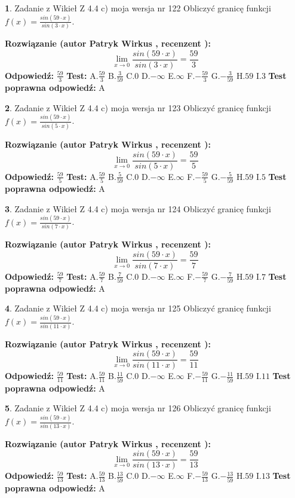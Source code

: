 \documentclass[12pt, a4paper]{article}
\theoremstyle{definition} %
\newtheorem{zad}{}
\newcommand{\zadStart}[1]{\begin{zad}#1\newline}
\newcommand{\zadStop}{\end{zad}}
\newcommand{\rozwStart}[2]{\noindent \textbf{Rozwiązanie (autor #1 , recenzent #2): }\newline}
\newcommand{\rozwStop}{\newline}
\newcommand{\odpStart}{\noindent \textbf{Odpowiedź:}\newline}
\newcommand{\odpStop}{\newline}
\newcommand{\testStart}{\noindent \textbf{Test:}\newline}
\newcommand{\testStop}{\newline}
\newcommand{\kluczStart}{\noindent \textbf{Test poprawna odpowiedź:}\newline}
\newcommand{\kluczStop}{\newline}
\begin{document}
\zadStart{Zadanie z Wikieł Z 4.4 c) moja wersja nr 122}
Obliczyć granicę funkcji $f(x)=\frac{sin(59\cdot x)}{sin(3\cdot x)}$.
\zadStop
\rozwStart{Patryk Wirkus}{}
$$\lim\limits_{x\to 0}\frac{sin(59\cdot x)}{sin(3\cdot x)}=
\frac{59}{3}$$
\rozwStop
\odpStart
$\frac{59}{3}$
\odpStop
\testStart
A.$\frac{59}{3}$
B.$\frac{3}{59}$
C.$0$
D.$-\infty$
E.$\infty$
F.$-\frac{59}{3}$
G.$-\frac{3}{59}$
H.$59$
I.$3$
\testStop
\kluczStart
A
\kluczStop



\zadStart{Zadanie z Wikieł Z 4.4 c) moja wersja nr 123}
Obliczyć granicę funkcji $f(x)=\frac{sin(59\cdot x)}{sin(5\cdot x)}$.
\zadStop
\rozwStart{Patryk Wirkus}{}
$$\lim\limits_{x\to 0}\frac{sin(59\cdot x)}{sin(5\cdot x)}=
\frac{59}{5}$$
\rozwStop
\odpStart
$\frac{59}{5}$
\odpStop
\testStart
A.$\frac{59}{5}$
B.$\frac{5}{59}$
C.$0$
D.$-\infty$
E.$\infty$
F.$-\frac{59}{5}$
G.$-\frac{5}{59}$
H.$59$
I.$5$
\testStop
\kluczStart
A
\kluczStop



\zadStart{Zadanie z Wikieł Z 4.4 c) moja wersja nr 124}
Obliczyć granicę funkcji $f(x)=\frac{sin(59\cdot x)}{sin(7\cdot x)}$.
\zadStop
\rozwStart{Patryk Wirkus}{}
$$\lim\limits_{x\to 0}\frac{sin(59\cdot x)}{sin(7\cdot x)}=
\frac{59}{7}$$
\rozwStop
\odpStart
$\frac{59}{7}$
\odpStop
\testStart
A.$\frac{59}{7}$
B.$\frac{7}{59}$
C.$0$
D.$-\infty$
E.$\infty$
F.$-\frac{59}{7}$
G.$-\frac{7}{59}$
H.$59$
I.$7$
\testStop
\kluczStart
A
\kluczStop



\zadStart{Zadanie z Wikieł Z 4.4 c) moja wersja nr 125}
Obliczyć granicę funkcji $f(x)=\frac{sin(59\cdot x)}{sin(11\cdot x)}$.
\zadStop
\rozwStart{Patryk Wirkus}{}
$$\lim\limits_{x\to 0}\frac{sin(59\cdot x)}{sin(11\cdot x)}=
\frac{59}{11}$$
\rozwStop
\odpStart
$\frac{59}{11}$
\odpStop
\testStart
A.$\frac{59}{11}$
B.$\frac{11}{59}$
C.$0$
D.$-\infty$
E.$\infty$
F.$-\frac{59}{11}$
G.$-\frac{11}{59}$
H.$59$
I.$11$
\testStop
\kluczStart
A
\kluczStop



\zadStart{Zadanie z Wikieł Z 4.4 c) moja wersja nr 126}
Obliczyć granicę funkcji $f(x)=\frac{sin(59\cdot x)}{sin(13\cdot x)}$.
\zadStop
\rozwStart{Patryk Wirkus}{}
$$\lim\limits_{x\to 0}\frac{sin(59\cdot x)}{sin(13\cdot x)}=
\frac{59}{13}$$
\rozwStop
\odpStart
$\frac{59}{13}$
\odpStop
\testStart
A.$\frac{59}{13}$
B.$\frac{13}{59}$
C.$0$
D.$-\infty$
E.$\infty$
F.$-\frac{59}{13}$
G.$-\frac{13}{59}$
H.$59$
I.$13$
\testStop
\kluczStart
A
\kluczStop
\end{document}
